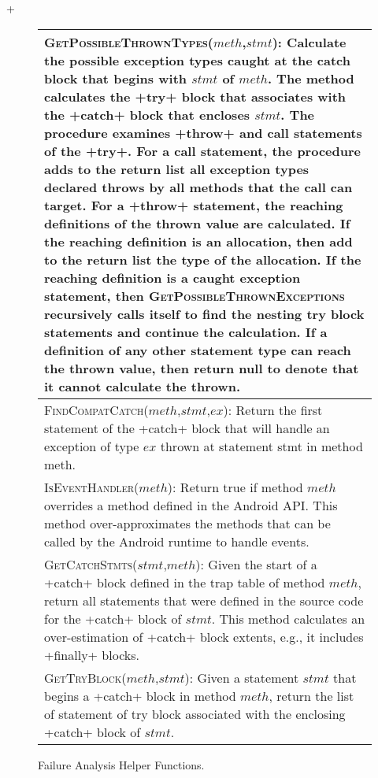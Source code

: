 \lstMakeShortInline[basicstyle=\scriptsize\ttfamily,keywordstyle=\color{DarkPurple},breaklines=true]+

\begin{figure}[t]
\scriptsize
\renewcommand*{\arraystretch}{1.3}
\begin{tabular}{|p{3.3in}|}
\hline 

\textsc{GetPossibleThrownTypes}($meth$,$stmt$): Calculate the
possible exception types caught at the catch block that begins with
$stmt$ of $meth$. The method calculates the
+try+ block that associates with the +catch+ block
that encloses $stmt$. The procedure examines +throw+
and call statements of the +try+.  For a call statement, the
procedure adds to the return list all exception types declared throws
by all methods that the call can target.  For a +throw+
statement, the reaching definitions of the thrown value are
calculated.  If the reaching definition is an allocation, then add to
the return list the type of the allocation.  If the reaching
definition is a caught exception statement, then
\textsc{GetPossibleThrownExceptions} recursively calls itself to find
the nesting try block statements and continue the calculation.  If a
definition of any other statement type can reach the thrown value,
then return null to denote that it cannot calculate the
thrown.  
\\
\hline
\textsc{FindCompatCatch}($meth$,$stmt$,$ex$): Return the first
  statement of the +catch+ block that will handle an
  exception of type $ex$ thrown at statement stmt in method meth.
\\
\hline
\textsc{IsEventHandler}($meth$): Return true if method $meth$
  overrides a method defined in the Android API.  This method
  over-approximates the methods that can be called by the Android
  runtime to handle events.
\\
\hline
\textsc{GetCatchStmts}($stmt$,$meth$): Given the start of a
+catch+ block defined in the trap table of method $meth$,
return all statements that were defined in the source code for the
+catch+ block of $stmt$.  This method calculates an
over-estimation of +catch+ block extents, e.g., it includes
+finally+ blocks.
\\
\hline
\textsc{GetTryBlock}($meth$,$stmt$): Given a statement $stmt$
  that begins a +catch+ block in method $meth$, return the
  list of statement of try block associated with the enclosing
  +catch+ block of $stmt$.
\\
\hline
\end{tabular}
\caption{\label{fig:helper-funs}Failure Analysis Helper Functions.}
\end{figure}

